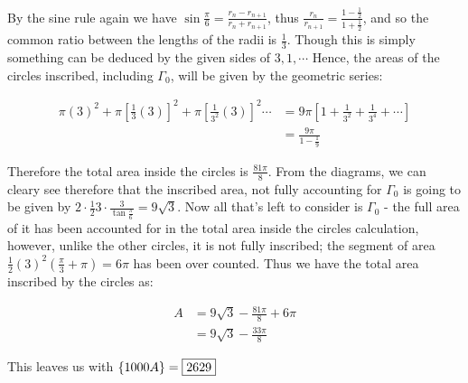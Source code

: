 \begin{solution}
By the sine rule again we have \(\sin\frac{\pi}{6}=\frac{r_n-r_{n+1}}{r_n+r_{n+1}}\), thus \(\frac{r_n}{r_{n+1}}=\frac{1-\frac{1}{2}}{1+\frac{1}{2}}\), and so the common ratio between the lengths of the radii is \(\frac{1}{3}\). Though this is simply something can be deduced by the given sides of \(3,1,\cdots\) Hence, the areas of the circles inscribed, including \(\Gamma_0\), will be given by the geometric series:

\begin{align*}
  \pi(3)^2+\pi\left[\frac{1}{3}(3)\right]^2+\pi\left[\frac{1}{3^2}(3)\right]^2\cdots&=9\pi\left[1+\frac{1}{3^2}+\frac{1}{3^4}+\cdots\right]\\
  &=\frac{9\pi}{1-\frac{1}{9}}
\end{align*}

Therefore the total area inside the circles is \(\frac{81\pi}{8}\). From the diagrams, we can cleary see therefore that the inscribed area, not fully accounting for \(\Gamma_0\) is going to be given by \(2\cdot\frac{1}{2}3\cdot\frac{3}{\tan\frac{\pi}{6}}=9\sqrt{3}\). Now all that's left to consider is \(\Gamma_0\) - the full area of it has been accounted for in the total area inside the circles calculation, however, unlike the other circles, it is not fully inscribed; the segment of area \(\frac{1}{2}(3)^2\left(\frac{\pi}{3}+\pi\right)=6\pi\) has been over counted. Thus we have the total area inscribed by the circles as:

\begin{align*}
  A&=9\sqrt{3}-\frac{81\pi}{8}+6\pi\\
  &=9\sqrt{3}-\frac{33\pi}{8}
\end{align*}

This leaves us with \(\{1000A\}=\fbox{2629}\)
\end{solution}\bigskip
